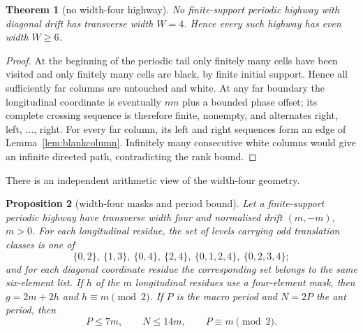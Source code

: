 \documentclass[11pt,reqno]{amsart}
\theoremstyle{plain}
\newtheorem{theorem}{Theorem}[section]
\newtheorem{proposition}[theorem]{Proposition}
\theoremstyle{definition}
\begin{document}
\begin{theorem}[no width-four highway]\label{thm:width4}
No finite-support periodic highway with diagonal drift has transverse width $W=4$.
Hence every such highway has even width $W\ge6$.
\end{theorem}

\begin{proof}
At the beginning of the periodic tail only finitely many cells have been visited and
only finitely many cells are black, by finite initial support.  Hence all sufficiently
far columns are untouched and white.  At any far boundary the
longitudinal coordinate is eventually $nm$ plus a bounded phase offset; its complete
crossing sequence is therefore finite, nonempty, and alternates right, left,
$\ldots$, right.  For every far column, its left and right sequences form an edge of
Lemma~\ref{lem:blankcolumn}.  Infinitely many consecutive white columns would give an
infinite directed path, contradicting the rank bound.
\end{proof}

There is an independent arithmetic view of the width-four geometry.

\begin{proposition}[width-four masks and period bound]\label{prop:width4arithmetic}
Let a finite-support periodic highway have transverse width four and normalised drift
$(m,-m)$, $m>0$.  For each longitudinal residue, the set of levels carrying odd translation classes
is one of
\[
\{0,2\},\ \{1,3\},\ \{0,4\},\ \{2,4\},\
\{0,1,2,4\},\ \{0,2,3,4\};
\]
and for each diagonal coordinate residue the corresponding set belongs to the same
six-element list.  If $h$ of the $m$
longitudinal residues use a four-element mask, then $g=2m+2h$ and
$h\equiv m\pmod2$.  If $P$ is the macro period and $N=2P$ the ant period, then
\[
P\le7m,\qquad N\le14m,\qquad P\equiv m\pmod2.
\]
\end{proposition}
\end{document}
